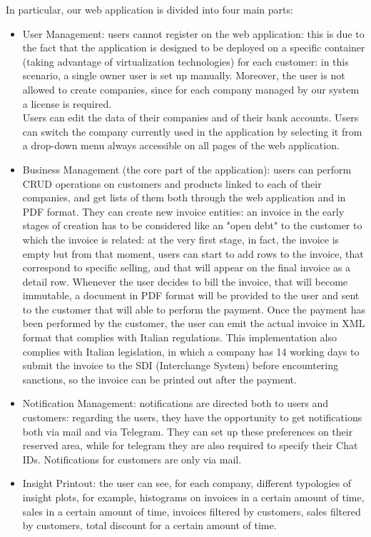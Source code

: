 In particular, our web application is divided into four main parts:
\begin{itemize}
    \item User Management: users cannot register on the web application: this is due to the fact that the application is designed to be deployed on a specific container (taking advantage of virtualization technologies) for each customer: in this scenario, a single owner user is set up manually. Moreover, the user is not allowed to create companies, since for each company managed by our system a license is required. \\
    Users can edit the data of their companies and of their bank accounts. Users can switch the company currently used in the application by selecting it from a drop-down menu always accessible on all pages of the web application.
    \item Business Management (the core part of the application): users can perform CRUD operations on customers and products linked to each of their companies, and get lists of them both through the web application and in PDF format. They can create new invoice entities: an invoice in the early stages of creation has to be considered like an "open debt" to the customer to which the invoice is related: at the very first stage, in fact, the invoice is empty but from that moment, users can start to add rows to the invoice, that correspond to specific selling, and that will appear on the final invoice as a detail row. Whenever the user decides to bill the invoice, that will become immutable, a document in PDF format will be provided to the user and sent to the customer that will able to perform the payment. Once the payment has been performed by the customer, the user can emit the actual invoice in XML format that complies with Italian regulations. This implementation also complies with Italian legislation, in which a company has 14 working days to submit the invoice to the SDI (Interchange System) before encountering sanctions, so the invoice can be printed out after the payment.
    \item Notification Management: notifications are directed both to users and customers: regarding the users, they have the opportunity to get notifications both via mail and via Telegram. They can set up these preferences on their reserved area, while for telegram they are also required to specify their Chat IDs. Notifications for customers are only via mail. 
    \item Insight Printout: the user can see, for each company, different typologies of insight plots, for example, histograms on invoices in a certain amount of time, sales in a certain amount of time, invoices filtered by customers, sales filtered by customers, total discount for a certain amount of time.
\end{itemize}

